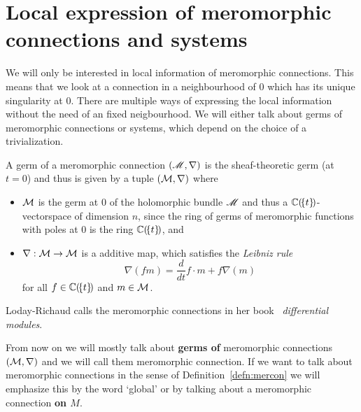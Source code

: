 \section{Local expression of meromorphic connections and systems}
We will only be interested in local information of meromorphic connections.
This means that we look at a connection in a neighbourhood of $0$ which has its
unique singularity at $0$.
There are multiple ways of expressing the local information without the need of
an fixed neigbourhood.
We will either talk about germs of meromorphic connections or systems, which
depend on the choice of a trivialization.
\begin{prop}
  A germ of a meromorphic connection $(\mathscr{M},\nabla)$ is the sheaf-theoretic
  germ (at $t=0$) and thus is given by a tuple $(\mathcal{M},\nabla)$ where
  \begin{itemize}
    \item $\mathcal{M}$ is the germ at $0$ of the holomorphic bundle $\mathscr{M}$ and thus a
      $\mathbb{C}(\!\{t\}\!)$-vectorspace of dimension $n$, since the ring of germs of
      meromorphic functions with poles at $0$ is the ring $\mathbb{C}(\!\{t\}\!)$, and
    \item $\nabla:\mathcal{M}\to \mathcal{M}$ is a additive map, which
      satisfies the \emph{Leibniz rule}
      \[
        \nabla(fm)=\frac{d}{dt} f\cdot m + f\nabla(m)
      \]
      for all $f\in\mathbb{C}(\!\{t\}\!)$ and $m\in \mathcal{M}$.
  \end{itemize}
  \begin{comment}
      \begin{s-rem}
      \marginnote{\cite{sabbah2007isomonodromic}}
      It is a $(\C(\!\{t\}\!),\nabla)$-vectorspace.
    \end{s-rem}
  \end{comment}
  \begin{s-rem}
    Loday-Richaud calls the meromorphic connections in her
    book~\cite[Def.4.2.1]{Loday2014} \emph{differential modules}.
  \end{s-rem}
\end{prop}
\begin{rem}\label{rem:GlobalNothingGerm}
  From now on we will mostly talk about \textbf{germs of} meromorphic
  connections $(\mathcal{M},\nabla)$ and we will call them meromorphic connection. If
  we want to talk about meromorphic connections in the sense of
  Definition~\ref{defn:mercon} we will emphasize this by the word `global' or
  by talking about a meromorphic connection \textbf{on $M$}.
\end{rem}
